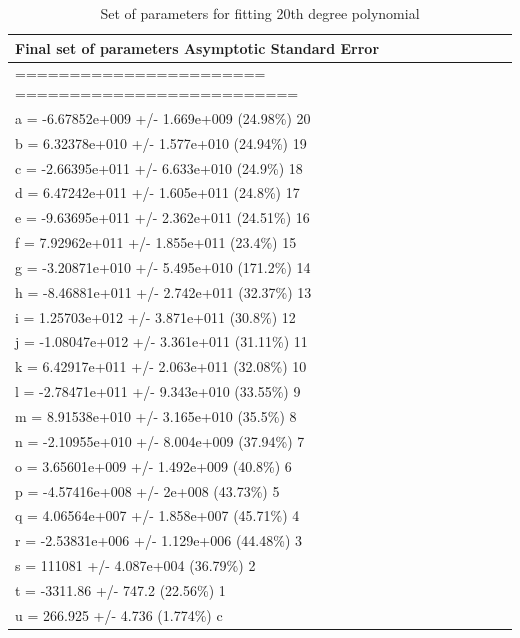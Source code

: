 \documentclass{article}
\begin{document}
\begin{table}[]
\centering
\caption{Set of parameters for fitting 20th degree polynomial}
\label{nathantable1}
\begin{tabular}{@{}l@{}}
\toprule
Final set of parameters            Asymptotic Standard Error     \\ \midrule
=======================            ==========================    \\
a               = -6.67852e+009    +/- 1.669e+009   (24.98\%) 20 \\
b               = 6.32378e+010     +/- 1.577e+010   (24.94\%) 19 \\
c               = -2.66395e+011    +/- 6.633e+010   (24.9\%) 18  \\
d               = 6.47242e+011     +/- 1.605e+011   (24.8\%) 17  \\
e               = -9.63695e+011    +/- 2.362e+011   (24.51\%) 16 \\
f               = 7.92962e+011     +/- 1.855e+011   (23.4\%) 15  \\
g               = -3.20871e+010    +/- 5.495e+010   (171.2\%) 14 \\
h               = -8.46881e+011    +/- 2.742e+011   (32.37\%) 13 \\
i               = 1.25703e+012     +/- 3.871e+011   (30.8\%) 12  \\
j               = -1.08047e+012    +/- 3.361e+011   (31.11\%) 11 \\
k               = 6.42917e+011     +/- 2.063e+011   (32.08\%) 10 \\
l               = -2.78471e+011    +/- 9.343e+010   (33.55\%) 9  \\
m               = 8.91538e+010     +/- 3.165e+010   (35.5\%) 8   \\
n               = -2.10955e+010    +/- 8.004e+009   (37.94\%) 7  \\
o               = 3.65601e+009     +/- 1.492e+009   (40.8\%) 6   \\
p               = -4.57416e+008    +/- 2e+008       (43.73\%) 5  \\
q               = 4.06564e+007     +/- 1.858e+007   (45.71\%) 4  \\
r               = -2.53831e+006    +/- 1.129e+006   (44.48\%) 3  \\
s               = 111081           +/- 4.087e+004   (36.79\%) 2  \\
t               = -3311.86         +/- 747.2        (22.56\%) 1  \\
u               = 266.925          +/- 4.736        (1.774\%) c  \\ \bottomrule
\end{tabular}
\end{table}
\end{document}
